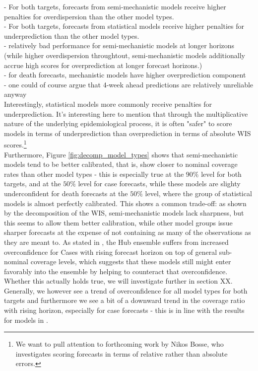 - For both targets, forecasts from semi-mechanistic models receive higher penalties for overdispersion than the other model types.\\
- For both targets, forecasts from statistical models receive higher penalties for underprediction than the other model types.\\
- relatively bad performance for semi-mechanistic models at longer horizons (while higher overdispersion throughtout, semi-mechanistic models additionally accrue high scores for overprediction at longer forecast horizons.)\\
- for death forecasts, mechanistic models have higher overprediction component\\
- one could of course argue that 4-week ahead predictions are relatively unreliable anyway \\
Interestingly, statistical models more commonly receive penalties for underprediction. It's interesting here to mention that through the multiplicative nature of the underlying epidemiological process, it is often "safer" to score models in terms of underprediction than overprediction in terms of absolute WIS scores.\footnote{We want to pull attention to forthcoming work by Nikos Bosse, who investigates scoring forecasts in terms of relative rather than absolute errors.}  \\
Furthermore, Figure \ref{fig:decomp_model_types} shows that semi-mechanistic models tend to be better calibrated, that is, show closer to nominal coverage rates than other model types - this is especially true at the $90\%$ level for both targets, and at the $50\%$ level for case forecasts, while these models are slighty underconfident for death forecasts at the $50\%$ level, where the group of statistical models is almost perfectly calibrated. This shows a common trade-off: as shown by the decomposition of the WIS, semi-mechanistic models lack sharpness, but this seems to allow them better calibration, while other model groups issue sharper forecasts at the expense of not containing as many of the observations as they are meant to. As stated in \cite{sherratt_european_2022}, the Hub ensemble suffers from increased overconfidence for Cases with rising forecast horizon on top of general sub-nominal coverage levels, which suggests that these models still might enter favorably into the ensemble by helping to counteract that overconfidence. Whether this actually holds true, we will investigate further in section XX. Generally, we however see a trend of overconfidence for all model types for both targets and furthermore we see a bit of a downward trend in the coverage ratio with rising horizon, especially for case forecasts - this is in line with the results for models in \cite{sherratt_european_2022}.
